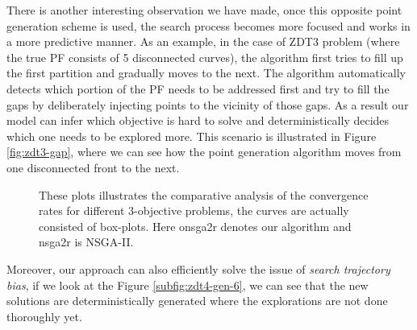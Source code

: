 \documentclass[journal]{IEEEtran}
\let\MYoriglatexcaption\caption
\renewcommand{\caption}[2][\relax]{\MYoriglatexcaption[#2]{#2}}
\begin{document}
There is another interesting observation we have made, once this opposite point generation scheme is used, the search process becomes more focused and works in a more predictive manner. As an example, in the case of ZDT3 problem (where the true PF consists of 5 disconnected curves), the algorithm first tries to fill up the first partition and gradually moves to the next. The algorithm automatically detects which portion of the PF needs to be addressed first and try to fill the gaps by deliberately injecting points to the vicinity of those gaps. As a result our model can infer which objective is hard to solve and deterministically decides which one needs to be explored more. This scenario is illustrated in Figure \ref{fig:zdt3-gap}, where we can see how the point generation algorithm moves from one disconnected front to the next.
%
\begin{figure*}[tp!]
	\centering
	\hfill
	\hfill
	\caption{These plots illustrates the comparative analysis of the convergence rates for different 3-objective problems, the curves are actually consisted of box-plots. Here onsga2r denotes our algorithm and nsga2r is NSGA-II.}
	\label{plot:onsga2r-hv-dtlz}
\end{figure*}
%

Moreover, our approach can also efficiently solve the issue of \textit{search trajectory bias}, if we look at the Figure \ref{subfig:zdt4-gen-6}, we can see that the new solutions are deterministically generated where the explorations are not done thoroughly yet.
\end{document}
